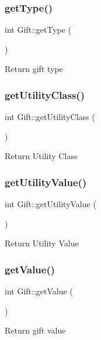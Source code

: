 \subsubsection{\texorpdfstring{get\+Type()}{getType()}}
{\footnotesize\ttfamily int Gift\+::get\+Type (\begin{DoxyParamCaption}{ }\end{DoxyParamCaption})}

Return gift type \mbox{\label{class_gift_a16a1e01228fcd6de8fd4b607a854d2b7}} 
\subsubsection{\texorpdfstring{get\+Utility\+Class()}{getUtilityClass()}}
{\footnotesize\ttfamily int Gift\+::get\+Utility\+Class (\begin{DoxyParamCaption}{ }\end{DoxyParamCaption})}

Return Utility Class \mbox{\label{class_gift_a109b572cc26b20b8b745b959afae678e}} 
\subsubsection{\texorpdfstring{get\+Utility\+Value()}{getUtilityValue()}}
{\footnotesize\ttfamily int Gift\+::get\+Utility\+Value (\begin{DoxyParamCaption}{ }\end{DoxyParamCaption})}

Return Utility Value \mbox{\label{class_gift_aabddc4d671de70d9002461076999a574}} 
\subsubsection{\texorpdfstring{get\+Value()}{getValue()}}
{\footnotesize\ttfamily int Gift\+::get\+Value (\begin{DoxyParamCaption}{ }\end{DoxyParamCaption})}

Return gift value \mbox{\label{class_gift_a6f03034c81bf5e709fd91078ef2d323b}} 
